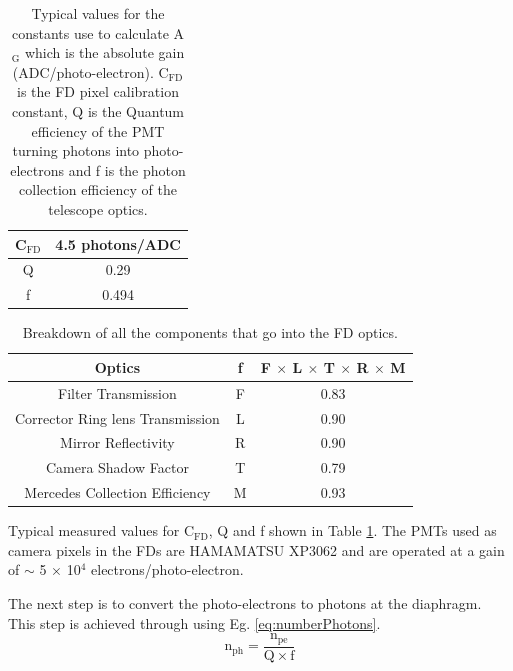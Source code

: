 \vspace{3mm}
\begin{table}[h]
\begin{center}
\begin{tabular}{|c|c|}
\hline 
C$_{\mathrm{FD}}$ & 4.5 photons/ADC \\
\hline
Q & 0.29 \\
\hline
f & 0.494 \\
\hline
\end{tabular} 
\end{center}
\caption{Typical values for the constants use to calculate A$_{\mathrm{G}}$ which is the absolute gain (ADC/photo-electron). $\mathrm{C}_{\mathrm{FD}}$ is the FD pixel calibration constant, Q is the Quantum efficiency of the PMT turning photons into photo-electrons and f is the photon collection efficiency of the telescope optics.} \label{tab:CFD_Q_F}
\end{table} 

\begin{table}[h]
\centering
\begin{tabular}{|c|c|c|}
\hline
Optics & f & F $\times$ L $\times$ T $\times$ R $\times$ M \\ \hline
Filter Transmission & F & 0.83 \\ \hline
Corrector Ring lens Transmission & L & 0.90 \\ \hline
Mirror Reflectivity & R & 0.90 \\ \hline
Camera Shadow Factor & T & 0.79 \\ \hline
Mercedes Collection Efficiency & M & 0.93 \\ \hline
\end{tabular}
\caption{Breakdown of all the components that go into the FD optics.}\label{tab:OpticsBreakdown}
\end{table}

Typical measured values for C$_{\mathrm{FD}}$, Q and f shown in Table \ref{tab:CFD_Q_F}. The PMTs used as camera pixels in the FDs are HAMAMATSU XP3062 and are operated at a gain of $\sim$ 5 $\times$ 10$^4$ electrons/photo-electron.

The next step is to convert the photo-electrons to photons at the diaphragm. This step is achieved through using Eg. \ref{eq:numberPhotons}.
\begin{equation}
\mathrm{n}_{\mathrm{ph}} = \frac{\mathrm{n}_{\mathrm{pe}}}{\mathrm{Q} \times \mathrm{f}} \label{eq:numberPhotons}
\end{equation}

